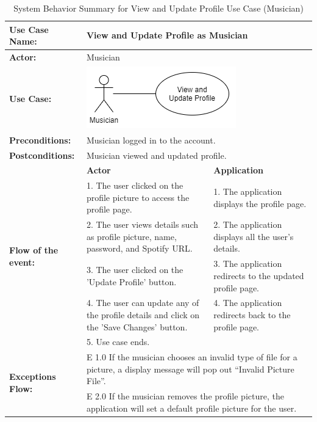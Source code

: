 \begin{longtable}{|p{3cm}|p{5cm}|p{5cm}|}
    \caption{System Behavior Summary for View and Update Profile Use Case (Musician)} \\
    \hline
    \textbf{Use Case Name:} & \multicolumn{2}{l|}{View and Update Profile as Musician} \\ \hline
    \textbf{Actor:} & \multicolumn{2}{l|}{Musician} \\ \hline
    \textbf{Use Case:} & \multicolumn{2}{l|}{\includegraphics[width=0.5\linewidth]{mainmatter/images/sucd3.png}} \\ \hline
    \textbf{Preconditions:} & \multicolumn{2}{p{10cm}|}{Musician logged in to the account.} \\ \hline
    \textbf{Postconditions:} & \multicolumn{2}{p{10cm}|}{Musician viewed and updated profile.} \\ \hline
    \multirow{6}{3cm}{\raggedright \textbf{Flow of the event:}} & \textbf{Actor} & \textbf{Application} \\ \cline{2-3}
    & 1. The user clicked on the profile picture to access the profile page. & 1. The application displays the profile page. \\ \cline{2-3}
    & 2. The user views details such as profile picture, name, password, and Spotify URL. & 2. The application displays all the user's details.  \\ \cline{2-3}
    & 3. The user clicked on the 'Update Profile' button. & 3. The application redirects to the updated profile page.  \\ \cline{2-3}
    & 4. The user can update any of the profile details and click on the 'Save Changes' button. & 4. The application redirects back to the profile page. \\ \cline{2-3}
    & 5. Use case ends. & \\ \hline
    \multirow{2}{3cm}{\raggedright \textbf{Exceptions Flow:}} & \multicolumn{2}{p{10cm}|}{\raggedright E 1.0 If the musician chooses an invalid type of file for a picture, a display message will pop out “Invalid Picture File”.} \\ \cline{2-3}
    & \multicolumn{2}{p{10cm}|}{\raggedright E 2.0 If the musician removes the profile picture, the application will set a default profile picture for the user.} \\ \hline
\end{longtable}
\pagebreak

